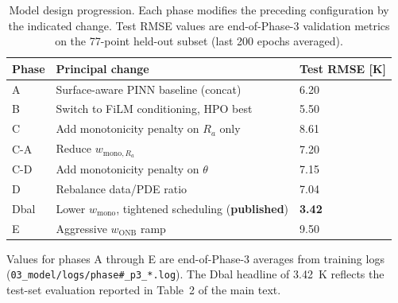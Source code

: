 \documentclass[11pt, a4paper]{article}
\begin{document}
\begin{table}[ht]
\centering
\caption{Model design progression. Each phase modifies the
  preceding configuration by the indicated change. Test RMSE values
  are end-of-Phase-3 validation metrics on the \num{77}-point held-out
  subset (last 200 epochs averaged).}
\label{tab:supp_phases}
\small
\begin{tabular}{lll}
\toprule
Phase & Principal change                       & Test RMSE [K] \\
\midrule
A     & Surface-aware PINN baseline (concat)   & 6.20 \\
B     & Switch to FiLM conditioning, HPO best  & 5.50 \\
C     & Add monotonicity penalty on $R_a$ only & 8.61 \\
C-A   & Reduce $w_{\mathrm{mono},R_a}$         & 7.20 \\
C-D   & Add monotonicity penalty on $\theta$   & 7.15 \\
D     & Rebalance data/PDE ratio               & 7.04 \\
Dbal  & Lower $w_{\mathrm{mono}}$, tightened
        scheduling (\textbf{published})        & \textbf{3.42} \\
E     & Aggressive $w_{\mathrm{ONB}}$ ramp     & 9.50 \\
\bottomrule
\end{tabular}

\vspace{0.5em}
Values for phases A through E are end-of-Phase-3 averages from
training logs (\texttt{03\_model/logs/phase\#\_p3\_*.log}).
The Dbal headline of \SI{3.42}{K} reflects the test-set evaluation
reported in Table~2 of the main text.
\end{table}
\end{document}
